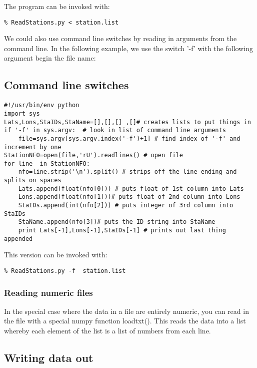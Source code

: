 {\noindent The program can be invoked with:

{\color{blue}\begin{verbatim}
% ReadStations.py < station.list
\end{verbatim}}

We could also use command line switches by reading in arguments from the command line.  In the following example, we use the switch '-f' with the following argument begin the file name: 
 
\subsection{Command line switches}

{\singlespacing \color{blue} \begin{verbatim}
#!/usr/bin/env python
import sys
Lats,Lons,StaIDs,StaName=[],[],[] ,[]# creates lists to put things in
if '-f' in sys.argv:  # look in list of command line arguments
    file=sys.argv[sys.argv.index('-f')+1] # find index of '-f' and increment by one
StationNFO=open(file,'rU').readlines() # open file
for line  in StationNFO:
    nfo=line.strip('\n').split() # strips off the line ending and splits on spaces
    Lats.append(float(nfo[0])) # puts float of 1st column into Lats
    Lons.append(float(nfo[1]))# puts float of 2nd column into Lons
    StaIDs.append(int(nfo[2])) # puts integer of 3rd column into StaIDs
    StaName.append(nfo[3])# puts the ID string into StaName
    print Lats[-1],Lons[-1],StaIDs[-1] # prints out last thing appended
\end{verbatim}}

\noindent This version can be invoked with:

{\color{blue}\begin{verbatim}
% ReadStations.py -f  station.list
\end{verbatim}}

\subsubsection{Reading numeric files}

In the special case where the data in a file are entirely numeric, you can read in the file with a special {\color{blue}numpy} function {\color{blue}loadtxt()}.  This reads the data into a list whereby each element of the list is a list of numbers from each line.
 
 \subsection{Writing data out}

}
